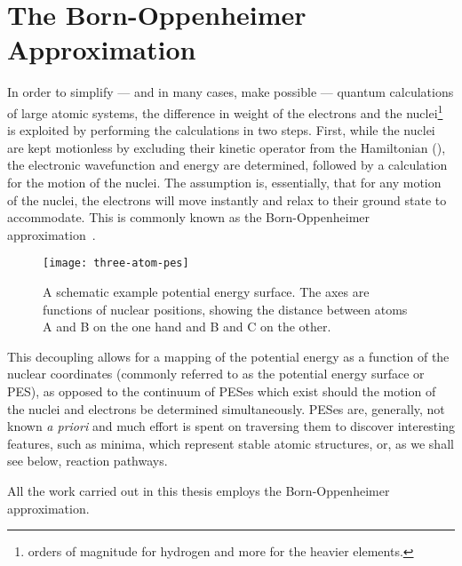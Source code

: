 \section{The Born-Oppenheimer Approximation}
\label{sec:born-oppenheimer}
In order to simplify --- and in many cases, make possible --- quantum calculations of large atomic systems, the difference in weight of the electrons and the nuclei\footnote{ orders of magnitude for hydrogen and more for the heavier elements.} is exploited by performing the calculations in two steps.
First, while the nuclei are kept motionless by excluding their kinetic operator from the Hamiltonian (), the electronic wavefunction and energy are determined, followed by a calculation for the motion of the nuclei.
The assumption is, essentially, that for any motion of the nuclei, the electrons will move instantly and relax to their ground state to accommodate.
This is commonly known as the Born-Oppenheimer approximation~\cite{born-oppenheimer-1927}.

\begin{figure}[h]
  \begin{center}
    \texttt{[image: three-atom-pes]}
\parbox{0.85\linewidth}{
    \caption{
A schematic example potential energy surface.
The axes are functions of nuclear positions, showing the distance between atoms A and B on the one hand and B and C on the other.
\expand
}
\label{fig:dimer-force-overview}
}
  \end{center}
\end{figure}


This decoupling allows for a mapping of the potential energy as a function of the nuclear coordinates (commonly referred to as the potential energy surface or PES), as opposed to the continuum of PESes which exist should the motion of the nuclei and electrons be determined simultaneously.
PESes are, generally, not known \textit{a priori} and much effort is spent on traversing them to discover interesting features, such as minima, which represent stable atomic structures, or, as we shall see below, reaction pathways.


All the work carried out in this thesis employs the Born-Oppenheimer approximation.
